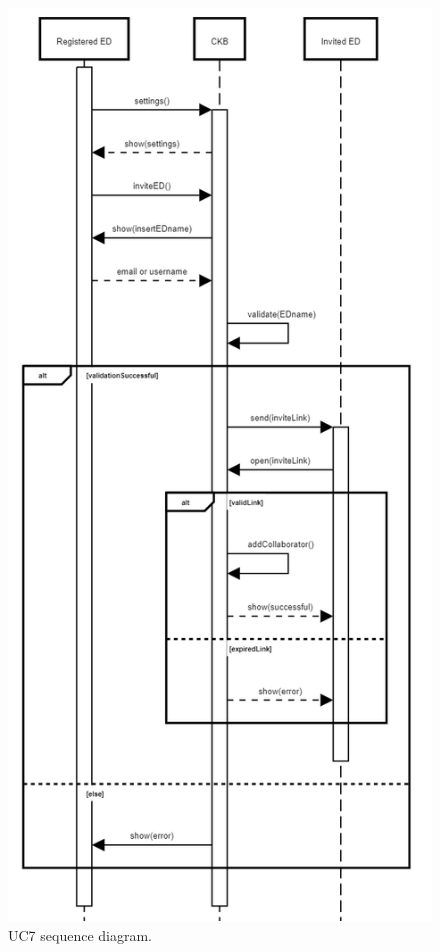 \begin{center}
  \begin{figure} [H]
    \begin{center}
        \includegraphics[width=\textwidth,height=\textheight,keepaspectratio]{Images/UseCaseDiagrams/UC7.png}
        \caption{UC7 sequence diagram.}
        \label{fig: UC7_sequence_diagram}
    \end{center}
  \end{figure}
\end{center}

